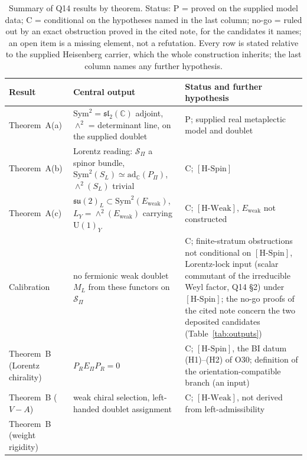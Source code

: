 \documentclass[11pt,a4paper]{article}
\theoremstyle{definition}
\newcommand{\su}{\mathfrak{su}}
\newcommand{\UU}{\mathrm{U}}
\newcommand{\Sbundle}{\mathcal{S}_\Pi}
\newcommand{\Epi}{E_\Pi}
\newcommand{\adC}{\mathrm{ad}_\mathbb{C}}
\newcommand{\Ew}{E_{\mathrm{weak}}}
\newcommand{\HSpin}{\ensuremath{[\mathrm{H\text{-}Spin}]}}
\newcommand{\HWeak}{\ensuremath{[\mathrm{H\text{-}Weak}]}}
\begin{document}
        \renewcommand{\arraystretch}{1.2}
        \begin{longtable}[c]{@{}>{\raggedright\arraybackslash}p{3.2cm}
         >{\raggedright\arraybackslash}p{6.0cm} >{\raggedright\arraybackslash}p{4.6cm}@{}}
          \caption{Summary of Q14 results by theorem.
        Status: P = proved on the supplied model data; C = conditional on the hypotheses named in the last column;
        no-go = ruled out by an exact obstruction proved in the cited note, for the candidates it names;
        an open item is a missing element, not a refutation.
        Every row is stated relative to the supplied Heisenberg carrier, which the whole
        construction inherits; the last column names any further hypothesis.}
        \label{tab:results}\\
          \toprule
          Result & Central output & Status and further hypothesis \\
          \midrule
          Theorem~A(a)
            & $\mathrm{Sym}^2 = \mathfrak{sl}_2(\mathbb{C})$ adjoint, $\wedge^2$ = determinant line, on the supplied
              doublet
            & P; supplied real metaplectic model and doublet \\
          Theorem~A(b)
            & Lorentz reading: $\Sbundle$ a spinor bundle, $\mathrm{Sym}^2(S_L) \simeq \adC(P_\Pi)$, $\wedge^2(S_L)$
              trivial
            & C; \HSpin{} \\
          Theorem~A(c)
            & $\su(2)_L \subset \mathrm{Sym}^2(\Ew)$, $L_Y = \wedge^2(\Ew)$ carrying $\UU(1)_Y$
            & C; \HWeak{}, $\Ew$ not constructed \\
          Calibration~\cite{Beau2026nsr}
            & no fermionic weak doublet $M_L$ from these functors on $\Sbundle$
            & C; finite-stratum obstructions not conditional on \HSpin{}, Lorentz-lock input (scalar commutant of
              the irreducible Weyl
              factor, Q14 \S2) under \HSpin{}; the no-go proofs of the cited note concern the two deposited
              candidates (Table~\ref{tab:outputs}) \\
          Theorem~B (Lorentz chirality)
            & $P_R \Epi P_R = 0$
            & C; \HSpin{}, the BI datum (H1)--(H2) of O30; definition of the orientation-compatible branch (an input) \\
          Theorem~B ($V-A$)
            & weak chiral selection, left-handed doublet assignment
            & C; \HWeak{}, not derived from left-admissibility \\
          Theorem~B (weight rigidity)

\end{longtable}
\end{document}
